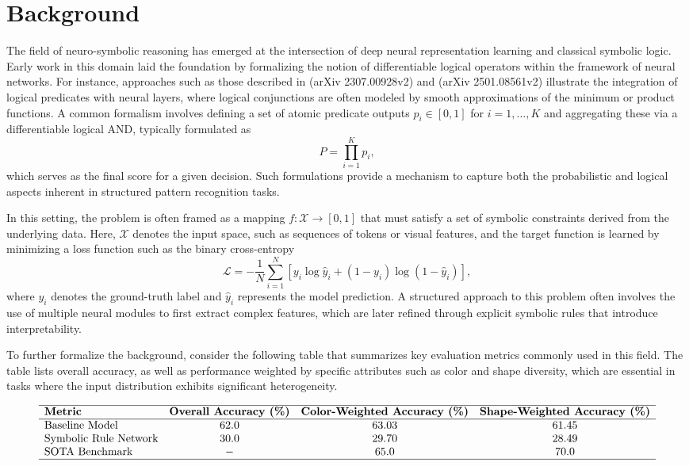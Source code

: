 \documentclass[11pt]{article}
\begin{document}
\section{Background}
The field of neuro-symbolic reasoning has emerged at the intersection of deep neural representation learning and classical symbolic logic. Early work in this domain laid the foundation by formalizing the notion of differentiable logical operators within the framework of neural networks. For instance, approaches such as those described in (arXiv 2307.00928v2) and (arXiv 2501.08561v2) illustrate the integration of logical predicates with neural layers, where logical conjunctions are often modeled by smooth approximations of the minimum or product functions. A common formalism involves defining a set of atomic predicate outputs \( p_i \in [0,1] \) for \( i = 1, \ldots, K \) and aggregating these via a differentiable logical AND, typically formulated as
\[
P = \prod_{i=1}^{K} p_i,
\]
which serves as the final score for a given decision. Such formulations provide a mechanism to capture both the probabilistic and logical aspects inherent in structured pattern recognition tasks.

In this setting, the problem is often framed as a mapping \( f: \mathcal{X} \to [0,1] \) that must satisfy a set of symbolic constraints derived from the underlying data. Here, \(\mathcal{X}\) denotes the input space, such as sequences of tokens or visual features, and the target function is learned by minimizing a loss function such as the binary cross-entropy
\[
\mathcal{L} = -\frac{1}{N} \sum_{i=1}^{N} \left[y_i \log \hat{y}_i + (1-y_i) \log (1-\hat{y}_i)\right],
\]
where \(y_i\) denotes the ground-truth label and \(\hat{y}_i\) represents the model prediction. A structured approach to this problem often involves the use of multiple neural modules to first extract complex features, which are later refined through explicit symbolic rules that introduce interpretability.

To further formalize the background, consider the following table that summarizes key evaluation metrics commonly used in this field. The table lists overall accuracy, as well as performance weighted by specific attributes such as color and shape diversity, which are essential in tasks where the input distribution exhibits significant heterogeneity.

\[
\begin{array}{lccc}
\hline
\textbf{Metric} & \textbf{Overall Accuracy (\%)} & \textbf{Color-Weighted Accuracy (\%)} & \textbf{Shape-Weighted Accuracy (\%)} \\
\hline
\text{Baseline Model} & 62.0 & 63.03 & 61.45 \\
\text{Symbolic Rule Network} & 30.0 & 29.70 & 28.49 \\
\text{SOTA Benchmark} & - & 65.0 & 70.0 \\
\hline
\end{array}
\]
\end{document}
